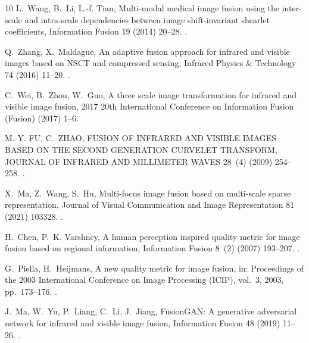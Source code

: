 \begin{thebibliography}{10}
L.~Wang, B.~Li, L.-f. Tian, {Multi-modal medical image fusion using the
  inter-scale and intra-scale dependencies between image shift-invariant
  shearlet coefficients}, Information Fusion 19 (2014) 20--28.
\newblock \href {https://doi.org/10.1016/j.inffus.2012.03.002}
  {}.

Q.~Zhang, X.~Maldague, {An adaptive fusion approach for infrared and visible
  images based on NSCT and compressed sensing}, Infrared Physics \& Technology
  74 (2016) 11--20.
\newblock \href {https://doi.org/10.1016/j.infrared.2015.11.003}
  {}.

C.~Wei, B.~Zhou, W.~Guo, {A three scale image transformation for infrared and
  visible image fusion}, 2017 20th International Conference on Information
  Fusion (Fusion) (2017) 1--6\newblock \href {https://doi.org/10.23919/icif.2017.8009748}
  {}.

M.-Y. FU, C.~ZHAO, {FUSION OF INFRARED AND VISIBLE IMAGES BASED ON THE SECOND
  GENERATION CURVELET TRANSFORM}, JOURNAL OF INFRARED AND MILLIMETER WAVES
  28~(4) (2009) 254--258.
\newblock \href {https://doi.org/10.3724/sp.j.1010.2009.00254}
  {}.

X.~Ma, Z.~Wang, S.~Hu, {Multi-focus image fusion based on multi-scale sparse
  representation}, Journal of Visual Communication and Image Representation 81
  (2021) 103328.
\newblock \href {https://doi.org/10.1016/j.jvcir.2021.103328}
  {}.

H.~Chen, P.~K. Varshney, {A human perception inspired quality metric for image
  fusion based on regional information}, Information Fusion 8~(2) (2007)
  193--207.
\newblock \href {https://doi.org/10.1016/j.inffus.2005.10.001}
  {}.

G.~Piella, H.~Heijmans, {A new quality metric for image fusion}, in: Proceedings
  of the 2003 International Conference on Image Processing (ICIP), vol.~3, 2003,
  pp.~173--176.
\newblock \href {https://doi.org/10.1109/ICIP.2003.1247209}
  {}.

J.~Ma, W.~Yu, P.~Liang, C.~Li, J.~Jiang, {FusionGAN: A generative adversarial
  network for infrared and visible image fusion}, Information Fusion 48 (2019)
  11--26.
\newblock \href {https://doi.org/10.1016/j.inffus.2018.09.004}
  {}.


\end{thebibliography}
